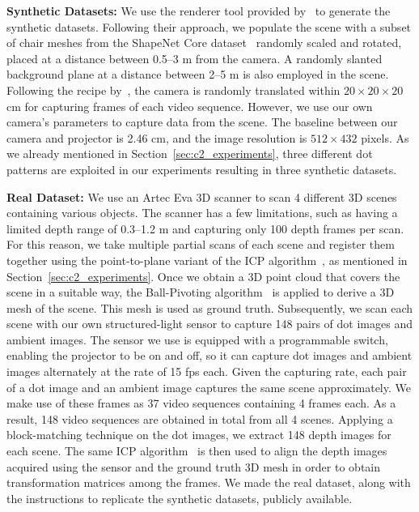 \noindent\textbf{Synthetic Datasets:} We use the renderer tool provided by~\cite{riegler2019connecting} to generate the synthetic datasets. Following their approach, we populate the scene with a subset of chair meshes from the ShapeNet Core dataset~\citep{shapenet2015} randomly scaled and rotated, placed at a distance between 0.5--3 m from the camera. A randomly slanted background plane at a distance between 2--5 m is also employed in the scene. Following the recipe by~\cite{riegler2019connecting}, the camera is randomly translated within $20 \times 20 \times 20$ cm for capturing frames of each video sequence. However, we use our own camera's parameters to capture data from the scene. The baseline between our camera and projector is 2.46 cm, and the image resolution is $512 \times 432$ pixels. As we already mentioned in Section~\ref{sec:c2_experiments}, three different dot patterns are exploited in our experiments resulting in three synthetic datasets.

\bigbreak\noindent\textbf{Real Dataset:} We use an Artec Eva 3D scanner to scan 4 different 3D scenes containing various objects. The scanner has a few limitations, such as having a limited depth range of 0.3--1.2 m and capturing only 100 depth frames per scan. For this reason, we take multiple partial scans of each scene and register them together using the point-to-plane variant of the ICP algorithm~\citep{rusinkiewicz2001efficient}, as mentioned in Section~\ref{sec:c2_experiments}. Once we obtain a 3D point cloud that covers the scene in a suitable way, the Ball-Pivoting algorithm~\citep{bernardini99ball} is applied to derive a 3D mesh of the scene. This mesh is used as ground truth. Subsequently, we scan each scene with our own structured-light sensor to capture 148 pairs of dot images and ambient images. The sensor we use is equipped with a programmable switch, enabling the projector to be on and off, so it can capture dot images and ambient images alternately at the rate of 15 fps each. Given the capturing rate, each pair of a dot image and an ambient image captures the same scene approximately. We make use of these frames as 37 video sequences containing 4 frames each. As a result, 148 video sequences are obtained in total from all 4 scenes. Applying a block-matching technique on the dot images, we extract 148 depth images for each scene. The same ICP algorithm~\citep{rusinkiewicz2001efficient} is then used to align the depth images acquired using the sensor and the ground truth 3D mesh in order to obtain transformation matrices among the frames. We made the real dataset, along with the instructions to replicate the synthetic datasets, publicly available.

